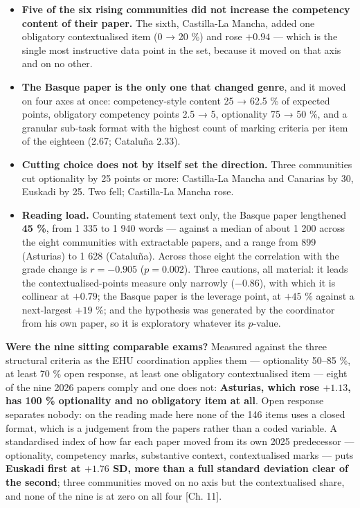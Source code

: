 \documentclass[
  10.5pt,
  a4paper,
  DIV=11,
  numbers=noendperiod]{scrartcl}
\newcounter{none} %
\providecommand{\tightlist}{%
  \setlength{\itemsep}{0pt}\setlength{\parskip}{0pt}}
\begin{document}
\begin{itemize}
\tightlist
\item
  \textbf{Five of the six rising communities did not increase the
  competency content of their paper.} The sixth, Castilla-La Mancha,
  added one obligatory contextualised item (0 → 20 \%) and rose
  \(+0.94\) --- which is the single most instructive data point in the
  set, because it moved on that axis and on no other.
\item
  \textbf{The Basque paper is the only one that changed genre}, and it
  moved on four axes at once: competency-style content 25 → 62.5 \% of
  expected points, obligatory competency points 2.5 → 5, optionality 75
  → 50 \%, and a granular sub-task format with the highest count of
  marking criteria per item of the eighteen (2.67; Cataluña 2.33).
\item
  \textbf{Cutting choice does not by itself set the direction.} Three
  communities cut optionality by 25 points or more: Castilla-La Mancha
  and Canarias by 30, Euskadi by 25. Two fell; Castilla-La Mancha rose.
\item
  \textbf{Reading load.} Counting statement text only, the Basque paper
  lengthened \textbf{45 \%}, from 1 335 to 1 940 words --- against a
  median of about 1 200 across the eight communities with extractable
  papers, and a range from 899 (Asturias) to 1 628 (Cataluña). Across
  those eight the correlation with the grade change is \(r = -0.905\)
  (\(p = 0.002\)). Three cautions, all material: it leads the
  contextualised-points measure only narrowly (\(-0.86\)), with which it
  is collinear at \(+0.79\); the Basque paper is the leverage point, at
  \(+45\) \% against a next-largest \(+19\) \%; and the hypothesis was
  generated by the coordinator from his own paper, so it is exploratory
  whatever its \(p\)-value.
\end{itemize}

\textbf{Were the nine sitting comparable exams?} Measured against the
three structural criteria as the EHU coordination applies them ---
optionality 50--85 \%, at least 70 \% open response, at least one
obligatory contextualised item --- eight of the nine 2026 papers comply
and one does not: \textbf{Asturias, which rose \(+1.13\), has 100 \%
optionality and no obligatory item at all}. Open response separates
nobody: on the reading made here none of the 146 items uses a closed
format, which is a judgement from the papers rather than a coded
variable. A standardised index of how far each paper moved from its own
2025 predecessor --- optionality, competency marks, substantive context,
contextualised marks --- puts \textbf{Euskadi first at \(+1.76\) SD,
more than a full standard deviation clear of the second}; three
communities moved on no axis but the contextualised share, and none of
the nine is at zero on all four {[}Ch. 11{]}.
\end{document}
